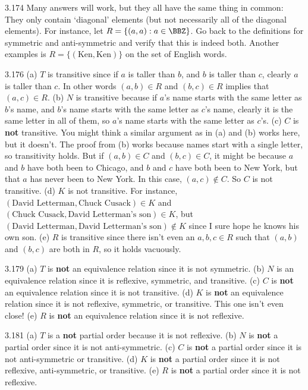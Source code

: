 \begin{Answer}{3.174}
Many answers will work, but they all have the same thing in common: They only contain
`diagonal' elements (but not necessarily all of the diagonal elements).
For instance, let $R=\{(a,a): a\in \BBZ\}$.
Go back to the definitions for symmetric and anti-symmetric and verify that this is indeed both.
Another examples is $R=\{(\mbox{Ken}, \mbox{Ken})\}$ on the set of English words.
\end{Answer}
\begin{Answer}{3.176}
(a) $T$ is transitive since if $a$ is taller than $b$, and $b$ is taller than $c$, clearly $a$ is taller
than $c$.  In other words $(a,b)\in R$ and $(b,c)\in R$ implies that $(a,c)\in R$.
(b) $N$ is transitive because if $a$'s name starts with the same letter as $b$'s name, and
$b$'s name starts with the same letter as $c$'s name, clearly it is the same letter in all of them,
so $a$'s name starts with the same letter as $c$'s.
(c) $C$ is {\bf not} transitive.  You might think a similar argument as in (a) and (b) works here, but
it doesn't.  The proof from (b) works because names start with a single letter, so
transitivity holds.  But if $(a,b)\in C$ and $(b,c)\in C$, it might be because $a$ and $b$ have both
been to Chicago, and $b$ and $c$ have both been to New York, but that $a$ has never been to New York.
In this case, $(a,c)\not\in C$.  So $C$ is not transitive.
(d) $K$ is not transitive.  For instance, $(\mbox{David Letterman},\mbox{Chuck Cusack})\in K$
and $(\mbox{Chuck Cusack},\mbox{David Letterman's son})\in K$, but $(\mbox{David Letterman},\mbox{David Letterman's son})\not\in K$ since I sure hope he knows his own son.
(e) $R$ is transitive since there isn't even an $a,b,c\in R$ such that $(a,b)$ and $(b,c)$ are both in $R$,
so it holds vacuously.
\end{Answer}
\begin{Answer}{3.179}
(a) $T$ is {\bf not} an equivalence relation since it is not symmetric.
(b) $N$ is an equivalence relation since it is reflexive, symmetric, and transitive.
(c) $C$ is {\bf not} an equivalence relation since it is not transitive.
(d) $K$ is {\bf not} an equivalence relation since it is not reflexive, symmetric, or transitive.
This one isn't even close!
(e) $R$ is {\bf not} an equivalence relation since it is not reflexive.
\end{Answer}
\begin{Answer}{3.181}
(a) $T$ is a {\bf not} partial order because it is not reflexive.
(b) $N$ is {\bf not} a partial order since it is not anti-symmetric.
(c) $C$ is {\bf not} a partial order since it is not anti-symmetric or transitive.
(d) $K$ is {\bf not} a partial order since it is not reflexive, anti-symmetric, or transitive.
(e) $R$ is {\bf not} a partial order since it is not reflexive.
\end{Answer}
